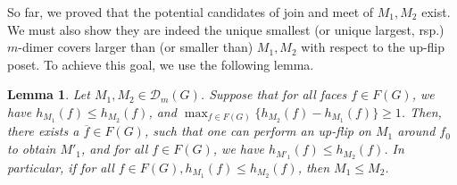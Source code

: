 \documentclass[11pt]{amsart}
\newtheorem{lem}[thm]{Lemma}
\theoremstyle{definition}
\theoremstyle{remark}
\numberwithin{equation}{section}
\begin{document}
So far, we proved that the potential candidates of join and meet of $M_1, M_2$ exist. We must also show they are indeed the unique smallest (or unique largest, rsp.) $m$-dimer covers larger than (or smaller than) $M_1,M_2$ with respect to the up-flip poset. To achieve this goal, we use the following lemma.
\begin{lem}\label{lem: compatibility_with_height_posets}
    Let $M_1, M_2\in \mathcal{D}_m(G)$. Suppose that for all faces $f\in F(G)$, we have $h_{M_1}(f)\leq h_{M_2}(f)$, and $\max_{f\in F(G)}\{h_{M_2}(f)-h_{M_1}(f)\}\geq 1$. Then, there exists a $\overline{f}\in F(G)$, such that one can perform an up-flip on $M_1$ around $f_0$ to obtain $M'_1$, and for all $f\in F(G)$, we have $h_{M'_1}(f)\leq h_{M_2}(f)$. In particular, if for all $f\in F(G), h_{M_1}(f)\leq h_{M_2}(f)$, then $M_1\leq M_2$.
\end{lem}
\end{document}
